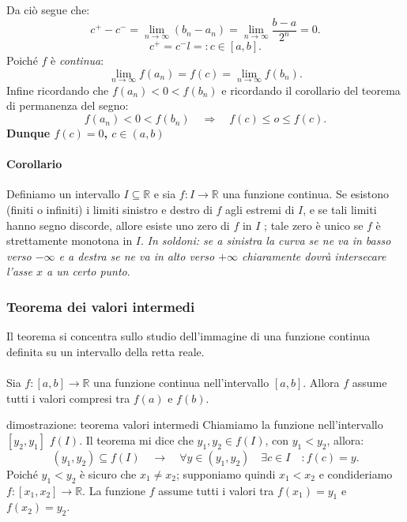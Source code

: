 \documentclass[x11names]{article}
\begin{document}
\begin{es}{}


Da ciò segue che:
\[
c^+ - c^- = \lim_{n\to \infty}\left(b_{n} - a_{n}\right) = \lim_{n\to \infty}\frac{b-a}{2^n} = 0
.\] 
\[
c^+ = c^-l =: c \in \left[a,b\right]
.\] 
Poiché $f$ è \textit{continua}:
\[
\lim_{n\to \infty}f\left(a_{n}\right)  = f\left(c\right) = \lim_{n\to \infty}f\left(b_{n}\right)
.\] 
Infine ricordando che $f\left(a_{n}\right) < 0 < f\left(b_{n}\right)$ e ricordando il corollario del teorema di permanenza del segno:
\[
f\left(a_{n}\right) < 0 < f\left(b_{n}\right) \quad \Rightarrow \quad f\left(c\right) \leq o \leq f\left(c\right)
.\] 
\textbf{Dunque $f\left(c\right) = 0$, $c \in \left(a,b\right)$ } 
\end{es}

\paragraph{Corollario}
Definiamo un intervallo $I \subseteq \mathbb{R}$ e sia $f:I \rightarrow \mathbb{R}$ una funzione continua. Se esistono (finiti o infiniti) i limiti sinistro e destro di $f$ agli estremi di $I$, e se tali limiti hanno segno discorde, allore esiste uno zero di $f$ in $I$ ; tale zero è unico se $f$ è strettamente monotona in $I$.
\textit{In soldoni: se a sinistra la curva se ne va in basso verso $-\infty$ e a destra se ne va in alto verso $+\infty$ chiaramente dovrà intersecare l'asse $x$ a un certo punto}.


\subsubsection{Teorema dei valori intermedi}
Il teorema si concentra sullo studio dell'immagine di una funzione continua definita su un intervallo  della retta reale.
\\ \\
Sia $f: \left[a,b\right]\rightarrow \mathbb{R}$ una funzione continua nell'intervallo $\left[a,b\right]$. Allora $f$ assume tutti i valori compresi tra $f\left(a\right)$ e $f\left(b\right)$.

\begin{center}

\end{center}

\begin{es}{dimostrazione: teorema valori intermedi}
Chiamiamo la funzione nell'intervallo $\left[y_2,y_1\right]$ $f\left(I\right)$. Il teorema mi dice che $y_1,y_2 \in f\left(I\right)$, con $y_1 < y_2$, allora:
\[
	\left(y_1,y_2\right) \subseteq f\left(I\right) \quad \rightarrow \quad  \forall y \in \left(y_1,y_2\right) \quad \exists c \in I \quad : f\left(c\right) = y
.\] 
Poiché $y_1 < y_2$ è sicuro che $x_1 \neq x_2$; supponiamo quindi $x_1 < x_2$ e condideriamo $f:\left[x_1,x_2\right] \rightarrow \mathbb{R}$.
La funzione   $f$ assume tutti i valori tra $f\left(x_1\right)=y_1$ e $f\left(x_2\right)=y_2$.

\end{es}
\end{document}
